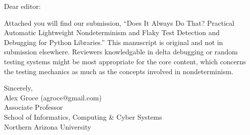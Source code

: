 \documentclass{letter}
\begin{document}
\begin{letter}{}

  \address{Alex Groce\\School of Informatics, Computing \& Cyber Systems\\Northern Arizona University}

  \opening{Dear editor:}

  Attached you will find our submission, ``Does It Always Do That?  Practical Automatic Lightweight Nondeterminism
  and Flaky Test
  Detection and Debugging for Python Libraries.''  This manuscript is original and not in submission elsewhere.  Reviewers knowledgable in delta debugging or random testing systems might be most appropriate for the core content, which concerns the testing mechanics as much as the concepts involved in nondeterminism.

  \closing{Sincerely,\\Alex Groce (agroce@gmail.com)\\Associate
    Professor\\
    School of Informatics, Computing \& Cyber Systems\\Northern Arizona University}

\end{letter}
\end{document}
